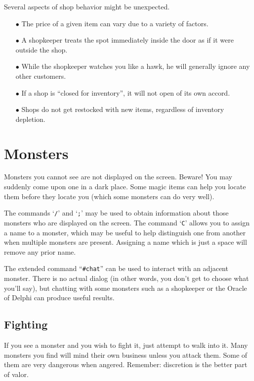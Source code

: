 Several aspects of shop behavior might be unexpected.

\begin{itemize}
\item[$\bullet$]
The price of a given item can vary due to a variety of factors.
\item[$\bullet$]
A shopkeeper treats the spot immediately inside the door as if it were
outside the shop.
\item[$\bullet$]
While the shopkeeper watches you like a hawk, he will generally ignore
any other customers.
\item[$\bullet$]
If a shop is ``closed for inventory'', it will not open of its own accord.
\item[$\bullet$]
Shops do not get restocked with new items, regardless of inventory depletion.
\end{itemize}

\section{Monsters}

Monsters you cannot see are not displayed on the screen.  Beware!
You may suddenly come upon one in a dark place.  Some magic items can
help you locate them before they locate you (which some monsters can do
very well).

The commands `{\tt /}' and `{\tt ;}' may be used to obtain information
about those
monsters who are displayed on the screen.  The command `{\tt C}' allows you
to assign a name to a monster, which may be useful to help distinguish
one from another when multiple monsters are present.  Assigning a name
which is just a space will remove any prior name.

The extended command ``{\tt \#chat}'' can be used to interact with an adjacent
monster.  There is no actual dialog (in other words, you don't get to
choose what you'll say), but chatting with some monsters such as a
shopkeeper or the Oracle of Delphi can produce useful results.

\subsection*{Fighting}

If you see a monster and you wish to fight it, just attempt to walk
into it.  Many monsters you find will mind their own business unless
you attack them.  Some of them are very dangerous when angered.
Remember:  discretion is the better part of valor.

